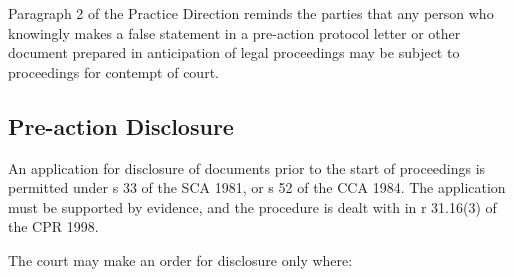 \documentclass[
]{article}
\begin{document}
Paragraph 2 of the Practice Direction reminds the parties that any
person who knowingly makes a false statement in a pre-action protocol
letter or other document prepared in anticipation of legal proceedings
may be subject to proceedings for contempt of court.

\hypertarget{pre-action-disclosure}{%
\subsection{Pre-action Disclosure}\label{pre-action-disclosure}}

An application for disclosure of documents prior to the start of
proceedings is permitted under s 33 of the SCA 1981, or s 52 of the CCA
1984. The application must be supported by evidence, and the procedure
is dealt with in r 31.16(3) of the CPR 1998.

The court may make an order for disclosure only where:
\end{document}
